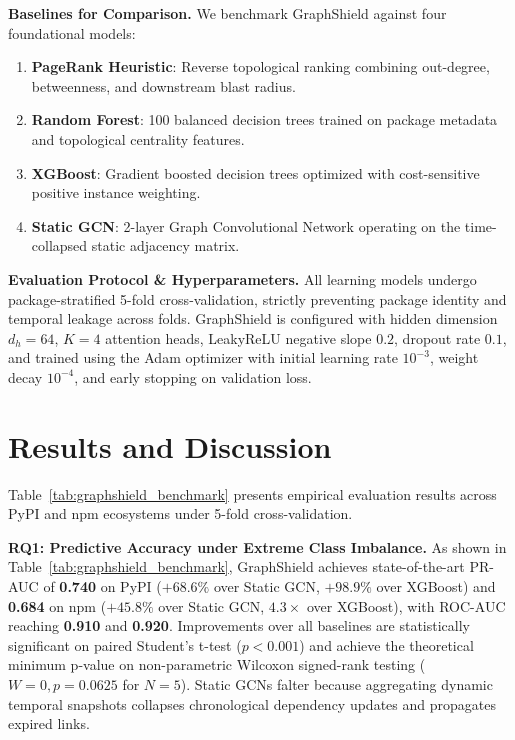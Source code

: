 \documentclass[sigconf,screen]{acmart}
\begin{document}
\noindent\textbf{Baselines for Comparison.} We benchmark GraphShield against four foundational models:
\begin{enumerate}
    \item \textbf{PageRank Heuristic}: Reverse topological ranking combining out-degree, betweenness, and downstream blast radius.
    \item \textbf{Random Forest}: 100 balanced decision trees trained on package metadata and topological centrality features.
    \item \textbf{XGBoost}: Gradient boosted decision trees optimized with cost-sensitive positive instance weighting.
    \item \textbf{Static GCN}: 2-layer Graph Convolutional Network operating on the time-collapsed static adjacency matrix.
\end{enumerate}

\noindent\textbf{Evaluation Protocol \& Hyperparameters.} All learning models undergo package-stratified 5-fold cross-validation, strictly preventing package identity and temporal leakage across folds. GraphShield is configured with hidden dimension $d_h = 64$, $K=4$ attention heads, LeakyReLU negative slope $0.2$, dropout rate $0.1$, and trained using the Adam optimizer with initial learning rate $10^{-3}$, weight decay $10^{-4}$, and early stopping on validation loss.

\section{Results and Discussion}
\label{sec:results}

Table~\ref{tab:graphshield_benchmark} presents empirical evaluation results across PyPI and npm ecosystems under 5-fold cross-validation.

\noindent\textbf{RQ1: Predictive Accuracy under Extreme Class Imbalance.} As shown in Table~\ref{tab:graphshield_benchmark}, GraphShield achieves state-of-the-art PR-AUC of \textbf{0.740} on PyPI ($+68.6\%$ over Static GCN, $+98.9\%$ over XGBoost) and \textbf{0.684} on npm ($+45.8\%$ over Static GCN, $4.3\times$ over XGBoost), with ROC-AUC reaching \textbf{0.910} and \textbf{0.920}. Improvements over all baselines are statistically significant on paired Student's t-test ($p < 0.001$) and achieve the theoretical minimum p-value on non-parametric Wilcoxon signed-rank testing ($W=0, p = 0.0625$ for $N=5$). Static GCNs falter because aggregating dynamic temporal snapshots collapses chronological dependency updates and propagates expired links.
\end{document}
